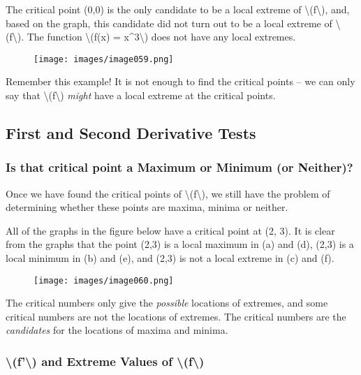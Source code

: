 The critical point (0,0) is the only candidate to be a local extreme of
\textbackslash{}(f\textbackslash{}), and, based on the graph, this
candidate did not turn out to be a local extreme of
\textbackslash{}(f\textbackslash{}). The function \textbackslash{}(f(x)
= x\^{}3\textbackslash{}) does not have any local extremes.

\begin{figure}
\centering
\texttt{[image: images/image059.png]}
\caption{}
\end{figure}

Remember this example! It is not enough to find the critical points --
we can only say that \textbackslash{}(f\textbackslash{}) \emph{might}
have a local extreme at the critical points.

\hypertarget{first-and-second-derivative-tests}{%
\subsection{First and Second Derivative
Tests}\label{first-and-second-derivative-tests}}

\hypertarget{is-that-critical-point-a-maximum-or-minimum-or-neither}{%
\subsubsection{Is that critical point a Maximum or Minimum (or
Neither)?}\label{is-that-critical-point-a-maximum-or-minimum-or-neither}}

Once we have found the critical points of
\textbackslash{}(f\textbackslash{}), we still have the problem of
determining whether these points are maxima, minima or neither.

All of the graphs in the figure below have a critical point at (2, 3).
It is clear from the graphs that the point (2,3) is a local maximum in
(a) and (d), (2,3) is a local minimum in (b) and (e), and (2,3) is not a
local extreme in (c) and (f).

\begin{figure}
\centering
\texttt{[image: images/image060.png]}
\caption{}
\end{figure}

The critical numbers only give the \emph{possible} locations of
extremes, and some critical numbers are not the locations of extremes.
The critical numbers are the \emph{candidates} for the locations of
maxima and minima.

\hypertarget{f-and-extreme-values-of-f}{%
\subsubsection{\textbackslash{}(f'\textbackslash{}) and Extreme Values
of
\textbackslash{}(f\textbackslash{})}\label{f-and-extreme-values-of-f}}

